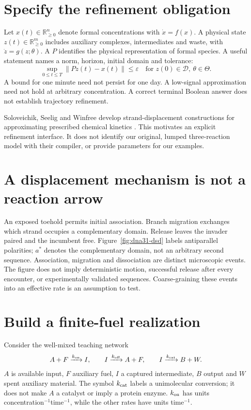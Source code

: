 \section{Specify the refinement obligation}
Let $x(t)\in\mathbb R_{\ge0}^{n}$ denote formal concentrations with
$\dot x=f(x)$. A physical state $z(t)\in\mathbb R_{\ge0}^{m}$ includes auxiliary
complexes, intermediates and waste, with $\dot z=g(z;\theta)$. A
 $P$ identifies the physical representation of formal
species. A useful statement names a norm, horizon, initial domain and tolerance:
\begin{equation}
 \sup_{0\le t\le T}\|Pz(t)-x(t)\|\le\varepsilon
 \quad\text{for }z(0)\in\mathcal D,\ \theta\in\Theta.
 \label{eq:dna31-refinement}
\end{equation}
A bound for one minute need not persist for one day. A low-signal approximation
need not hold at arbitrary concentration. A correct terminal Boolean answer
does not establish trajectory refinement.

Soloveichik, Seelig and Winfree develop strand-displacement constructions for
approximating prescribed chemical kinetics \cite{Soloveichik2010}. This motivates
an explicit refinement interface. It does not identify our original, lumped
three-reaction model with their compiler, or provide parameters for our examples.

\section{A displacement mechanism is not a reaction arrow}
An exposed toehold permits initial association. Branch migration exchanges which
strand occupies a complementary domain. Release leaves the invader paired and
the incumbent free. Figure~\ref{fig:dna31-dsd} labels antiparallel polarities;
$a^*$ denotes the complementary domain, not an arbitrary second sequence.
Association, migration and dissociation are distinct microscopic events. The
figure does not imply deterministic motion, successful release after every
encounter, or experimentally validated sequences. Coarse-graining these events
into an effective rate is an assumption to test.

\section{Build a finite-fuel realization}
Consider the well-mixed teaching network
\begin{equation}
 A+F\xrightarrow{k_{\rm on}}I,\qquad
 I\xrightarrow{k_{\rm off}}A+F,\qquad
 I\xrightarrow{k_{\rm cat}}B+W.
 \label{eq:dna31-network}
\end{equation}
$A$ is available input, $F$ auxiliary fuel, $I$ a captured intermediate,
$B$ output and $W$ spent auxiliary material. The symbol $k_{\rm cat}$ labels a
unimolecular conversion; it does not make $A$ a catalyst or imply a protein
enzyme. $k_{\rm on}$ has units concentration$^{-1}$time$^{-1}$, while the other
rates have units time$^{-1}$.

